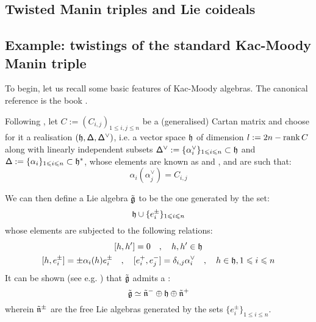     \subsection{Twisted Manin triples and Lie coideals}

    \subsection{Example: twistings of the standard Kac-Moody Manin triple}
        To begin, let us recall some basic features of Kac-Moody algebras. The canonical reference is the book \cite{kac_infinite_dimensional_lie_algebras}.
        
        Following \cite[Chapter 1]{kac_infinite_dimensional_lie_algebras}, let $C := ( C_{i, j} )_{1 \leq i, j \leq n}$ be a (generalised) Cartan matrix and choose for it a realisation $(\mathfrak{h}, \mathsf{\Delta}, \mathsf{\Delta}^{\vee})$, i.e. a vector space $\mathfrak{h}$ of dimension $l := 2n - \operatorname{rank} C$ along with linearly independent subsets $\mathsf{\Delta}^{\vee} := \{ \alpha_i^{\vee} \}_{1 \leqslant i \leqslant n} \subset \mathfrak{h}$ and $\mathsf{\Delta} := \{ \alpha_i \}_{1 \leqslant i \leqslant n} \subset \mathfrak{h}^*$, whose elements are known as  and , and are such that:
            \begin{equation} \label{equation: cartan_matrix_entries}
                \alpha_i( \alpha_j^{\vee} ) = C_{i, j}
            \end{equation}

        We can then define a Lie algebra $\tilde{\mathfrak{g}}$ to be the one generated by the set:
            \begin{equation} \label{equation: kac_moody_generators}
                \mathfrak{h} \cup \{ e_i^{\pm} \}_{1 \leqslant i \leqslant n}
            \end{equation}
        whose elements are subjected to the following relations:
            \begin{equation} \label{equation: extended_kac_moody_relations}
                \begin{gathered}
                    [h, h'] = 0 \quad, \quad h, h' \in \h
                    \\
                    [h, e_i^{\pm}] = \pm \alpha_i(h) e_i^{\pm} \quad, \quad [e_i^+, e_j^-] = \delta_{i, j} \alpha_i^{\vee} \quad, \quad h \in \h, 1 \leq i \leq n
                \end{gathered}
            \end{equation}
        It can be shown (see e.g. \cite[Theorem 1.2]{kac_infinite_dimensional_lie_algebras}) that $\tilde{\mathfrak{g}}$ admits a :
            $$\tilde{\mathfrak{g}} \simeq \tilde{\mathfrak{n}}^- \oplus \mathfrak{h} \oplus \tilde{\mathfrak{n}}^+$$
        wherein $\tilde{\mathfrak{n}}^{\pm}$ are the free Lie algebras generated by the sets $\{ e_i^{\pm} \}_{1 \leq i \leq n}$.
            
